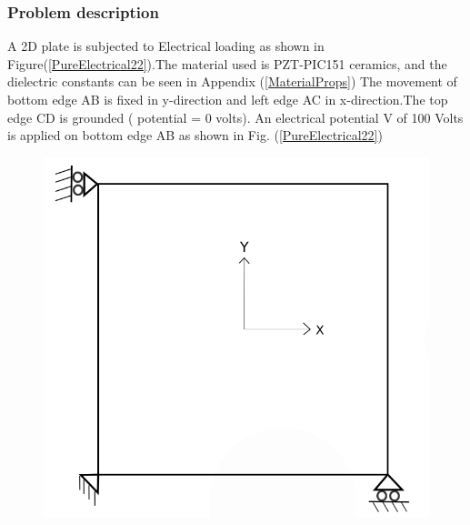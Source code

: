 \documentclass[11pt]{article}
\begin{document}
\subsubsection{Problem description}\label{2DPWPELPD}
A 2D plate is subjected to Electrical loading as shown in Figure(\ref{PureElectrical22}).The material used is PZT-PIC151 ceramics, and the dielectric constants can be seen in Appendix (\ref{MaterialProps})
The movement of bottom edge AB is fixed in y-direction and left edge AC in x-direction.The top edge CD is grounded ( potential = 0 volts). An electrical potential V of 100 Volts is applied on bottom edge AB as shown in Fig. (\ref{PureElectrical22})
\begin{figure}[H]
	\centering
	\begin{minipage}{.4\textwidth}
		\centering
		\includegraphics[width=0.8\linewidth]{2DPlate.png}
		\label{2Dplate}
	\end{minipage}%
	\begin{minipage}{.3\textwidth}
		\centering

\end{minipage}
\end{figure}
\end{document}
